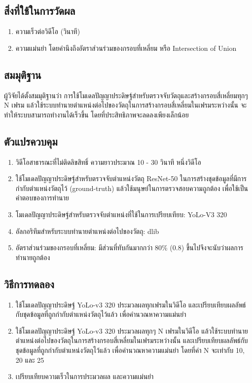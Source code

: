 \subsection*{สิ่งที่ใช้ในการวัดผล}
	\begin{enumerate}
		\item ความเร็วต่อวิดีโอ (วินาที)
		\item ความแม่นยำ โดยคำนึงถึงอัตราส่วนร่วมของกรอบที่เหลี่ยม หรือ Intersection of Union
	\end{enumerate}
\subsection*{สมมุติฐาน}
ผู้วิจัยได้ตั้งสมมุติฐานว่า การใช้โมเดลปัญญาประดิษฐ์สำหรับตรวจจับวัตถุและสร้างกรอบสี่เหลี่ยมทุกๆ N เฟรม 
แล้วใช้ระบบทำนายตำแหน่งต่อไปของวัตถุในการสร้างกรอบสี่เหลี่ยมในเฟรมระหว่างนั้น จะทำให้ระบบสามารถทำงานได้เร็วขึ้น โดยที่ประสิทธิภาพจะลดลงเพียงเล็กน้อย
\subsection*{ตัวแปรควบคุม}
	\begin{enumerate}
		\item วิดีโอสาธารณะที่ไม่ติดลิขสิทธิ์ ความยาวประมาณ 10 - 30 วินาที หนึ่งวิดีโอ
		\item ใช้โมเดลปัญญาประดิษฐ์สำหรับตรวจจับตำแหน่งวัตถุ ResNet-50 ในการสร้างชุดข้อมูลที่มีการกำกับตำแหน่งวัตถุไว้ (ground-truth) แล้วใช้มนุษย์ในการตรวจสอบความถูกต้อง
		เพื่อใช้เป็นคำตอบของการทำนาย
		\item โมเดลปัญญาประดิษฐ์สำหรับตรวจจับตำแหน่งที่ใช้ในการเปรียบเทียบ: YoLo-V3 320
		\item อัลกอริทึมสำหรับระบบทำนายตำแหน่งต่อไปของวัตถุ: dlib
		\item อัตราส่วนร่วมของกรอบที่เหลี่ยม: มีส่วนที่ทับกันมากกว่า 80\% (0.8) ขึ้นไปจึงจะนับว่าผลการทำนายถูกต้อง
	\end{enumerate}
\subsection*{วิธีการทดลอง}
	\begin{enumerate}
		\item ใช้โมเดลปัญญาประดิษฐ์ YoLo-v3 320 ประมวลผลทุกเฟรมในวิดีโอ และเปรียบเทียบผลลัพธ์กับชุดข้อมูลที่ถูกกำกับตำแหน่งวัตถุไว้แล้ว เพื่อคำนวณหาความแม่นยำ
		\item ใช้โมเดลปัญญาประดิษฐ์ YoLo-v3 320 ประมวลผลทุกๆ N เฟรมในวิดีโอ แล้วใช้ระบบทำนายตำแหน่งต่อไปของวัตถุในการสร้างกรอบสี่เหลี่ยมในเฟรมระหว่างนั้น 
		และเปรียบเทียบผลลัพธ์กับชุดข้อมูลที่ถูกกำกับตำแหน่งวัตถุไว้แล้ว เพื่อคำนวณหาความแม่นยำ โดยที่ค่า N จะเท่ากับ 10, 20 และ 25
		\item เปรียบเทียบความเร็วในการประมวลผล และความแม่นยำ
\end{enumerate}